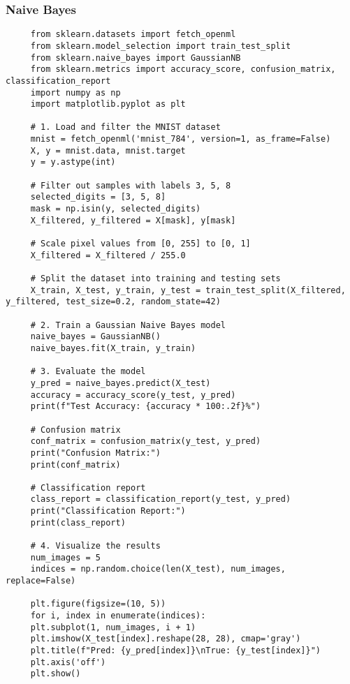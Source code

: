 \documentclass[letterpaper]{article}
\begin{document}
\subsubsection{Naive Bayes}
\begin{lstlisting}
     from sklearn.datasets import fetch_openml
     from sklearn.model_selection import train_test_split
     from sklearn.naive_bayes import GaussianNB
     from sklearn.metrics import accuracy_score, confusion_matrix, classification_report
     import numpy as np
     import matplotlib.pyplot as plt
     
     # 1. Load and filter the MNIST dataset
     mnist = fetch_openml('mnist_784', version=1, as_frame=False)
     X, y = mnist.data, mnist.target
     y = y.astype(int)
     
     # Filter out samples with labels 3, 5, 8
     selected_digits = [3, 5, 8]
     mask = np.isin(y, selected_digits)
     X_filtered, y_filtered = X[mask], y[mask]
     
     # Scale pixel values from [0, 255] to [0, 1]
     X_filtered = X_filtered / 255.0
     
     # Split the dataset into training and testing sets
     X_train, X_test, y_train, y_test = train_test_split(X_filtered, y_filtered, test_size=0.2, random_state=42)
     
     # 2. Train a Gaussian Naive Bayes model
     naive_bayes = GaussianNB()
     naive_bayes.fit(X_train, y_train)
     
     # 3. Evaluate the model
     y_pred = naive_bayes.predict(X_test)
     accuracy = accuracy_score(y_test, y_pred)
     print(f"Test Accuracy: {accuracy * 100:.2f}%")
     
     # Confusion matrix
     conf_matrix = confusion_matrix(y_test, y_pred)
     print("Confusion Matrix:")
     print(conf_matrix)
     
     # Classification report
     class_report = classification_report(y_test, y_pred)
     print("Classification Report:")
     print(class_report)
     
     # 4. Visualize the results
     num_images = 5
     indices = np.random.choice(len(X_test), num_images, replace=False)
     
     plt.figure(figsize=(10, 5))
     for i, index in enumerate(indices):
     plt.subplot(1, num_images, i + 1)
     plt.imshow(X_test[index].reshape(28, 28), cmap='gray')
     plt.title(f"Pred: {y_pred[index]}\nTrue: {y_test[index]}")
     plt.axis('off')
     plt.show()
\end{lstlisting}
	
\end{document}
